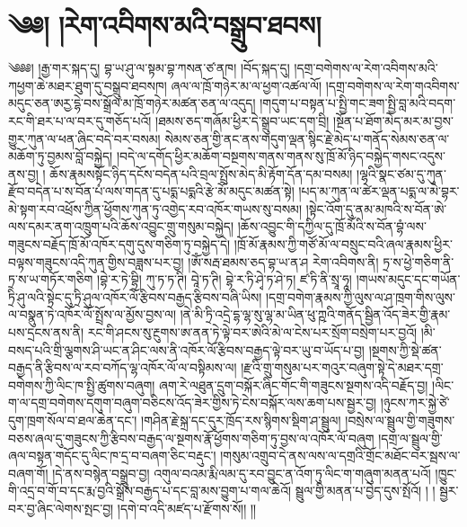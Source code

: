 \chapter{༄༅། །རེག་འབིགས་མའི་བསྒྲུབ་ཐབས།}༄༅༅། །རྒྱ་གར་སྐད་དུ། བྷ་ཡ་ཤུ་ལ་སྟམ་བྷ་ཀསན་ཙ་ནཁ། །བོད་སྐད་དུ། །དགྲ་བགེགས་ལ་རེག་འབིགས་མའི་ཀཕྱག་ཆེ་མཐར་ཐུག་དུ་བསྒྲུབ་ཐབསཁ། ཞལ་ལ་ཁྲོ་གཉེར་མ་ལ་ཕྱག་འཚལ་ལོ། །དགྲ་བགེགས་ལ་རེག་གའབིགས་མདུང་ཅན་ཨརྱ་དྷེ་བས་སྒྲོལ་མ་ཁྲོ་གཉེར་མཚན་ཅན་ལ་འདུད། །གདུག་པ་བསྟན་པ་སྤྱི་གང་ཟག་སྤྱི་བླ་མའི་བདག་རང་གི་ཐར་པ་ལ་བར་དུ་གཅོད་པའོ། །ཐམས་ཅད་གཞོམ་ཕྱིར་དེ་སྒྲུབ་ཡང་དག་བྲི། །སྔོན་པ་ཐོག་མེད་མར་མ་བྱས་གྱུར་ཀུན་ལ་ཕན་ཞིང་བདེ་བར་བསམ། སེམས་ཅན་གྱི་ནང་ནས་གདུག་ལྡན་སྙིང་རྗེ་མེད་པ་གནོད་སེམས་ཅན་ལ་མཆོག་ཏུ་བྱམས་བློ་བསྐྱེད། །བདེ་ལ་དགོད་ཕྱིར་མཆོག་བསྔགས་གནས་གནས་སུ་ཁྲོ་མོ་ཉིད་བསྐྱེད་གསང་འདུས་ནས་བྱ། ། ཆོས་རྣམསསྟོང་ཉིད་དངོས་བདེན་པའི་བྲལ་སྤྲོས་མེད་མི་རྟོག་དོན་དམ་བསམ། །ལྷའི་སྣང་ཙམ་དུ་ཀུན་རྫོབ་བདེན་པ་ས་བོན་པཾ་ལས་གདན་དུ་པདྨ་པདྨའི་རྩེ་མོ་མདུང་མཚན་སྟེ། །པད་མ་ཀུན་ལ་ཚེར་ལྡན་པདྨ་ལ་མེ་བྷར་མེ་སྟག་རབ་འཕྲོས་ཀྱིན་ཕྱོགས་ཀུན་ཏུ་འགྱེད་རབ་འཁོར་གཡས་སུ་བསམ། །སྟེང་འོག་དུ་ནམ་མཁའི་ས་བོན་ཨེ་ལས་དམར་ནག་འཁྲུག་པའི་ཆོས་འབྱུང་གྲུ་གསུམ་བསྐྱེད། །ཆོས་འབྱུང་གི་དཀྱིལ་དུ་ཁྲོ་མོའི་ས་བོན་བྷཾ་ལས་གཟུངས་བརྗོད་ཁྲོ་མོ་འཁོར་དགུ་དུས་གཅིག་ཏུ་བསྐྱེད་དེ། །ཁྲོ་མོ་རྣམས་ཀྱི་གཙོ་མོ་ལ་བསྲུང་བའི་ཞལ་རྣམས་ཕྱིར་བལྟས་གཟུངས་འདི་ཀུན་གྱིས་བཟླས་པར་བྱ། །ཨོཾ་སརྦ་ཐམས་ཅད་བྷ་ཡ་ན་ཤ རེག་འབིགས་ནི། ཏྲ་ས་ཕྱེ་གཅིག་ནི་ཏྲ་ས་ཡ་གཏོར་གཅིག །བྷེ་ར་ཏེ་བྷྲི། ཀུ་ཏ་ཏ་ཊི། བཱེ་ཏ་ཊི། བྷེ་ར་ཏི་ཤྭེ་ཏ་ཤེ་ཏ། ཛ་ཏི་ནི་སྲཱ་ཧཱ། །གཡས་མདུང་དང་གཡོན་ཏྲི་ཤུ་ལའི་སྟེང་དུ་ཏྲི་ཤུལ་འཁོར་ལོ་རྩིབས་བརྒྱད་རྩིབས་བཞི་ཡིས། །དགྲ་བགེག་རྣམས་ཀྱི་ལུས་ལ་ཤ་ཁྲག་གིས་ལུས་ལ་བསྣུན་ཏེ་འཁོར་ལོ་སྤྲོས་ལ་མྱོས་བྱས་ལ། །ནེ་མི་ཏྲི་འདྲེ་དྷ་ལྷ་སུ་ལྷ་མ་ཡིན་ཕུ་ཀྵའི་གནོད་སྦྱིན་འོད་ཟེར་གྱི་རྣམ་པས་དྲངས་ནས་ནི། རང་གི་ཤངས་སུ་རྔུགས་ཨ་ནན་ཏེ་ལྟེ་བར་ཨེའི་མེ་ལ་ངེས་པར་སྲོག་བསྲེག་པར་བྱའོ། །མི་བསད་པའི་གྲི་ལྕགས་ཤི་ཡང་ན་ཤིང་ལས་ནི་འཁོར་ལོ་རྩིབས་བརྒྱད་ལྟེ་བར་ཡུ་བ་ཡོད་པ་བྱ། །སྔགས་ཀྱི་སྡེ་ཚན་བརྒྱད་ནི་རྩིབས་ལ་རབ་བཀོད་ལྷ་འཁོར་ལོ་ལ་བསྟིམས་ལ། །རྫའི་གྲུ་གསུམ་པར་གའུར་བཞུག་སྟེ་དེ་མཐར་དགྲ་བགེགས་ཀྱི་ལིང་ཁ་སྤྱི་ཚུགས་བཞུག། ཞག་རེ་ལཐུན་དྲུག་བསྐོར་ཞིང་གོང་གི་གཟུངས་སྔགས་འདི་བརྗོད་བྱ། །ལིང་ག་ལ་དགྲ་བགེགས་དགུག་བཞུག་བཅིངས་འོད་ཟེར་གྱིས་ཏེ་ངེས་བསྐོར་ལས་ཆག་པས་སྦྱར་བྱ། །ཉུངས་ཀར་སྐྱེ་ཙེ་དུག་ཁྲག་སོལ་བ་ཐལ་ཆེན་དང་། །གཤིན་རྗེ་སྐྲ་དང་དུར་ཁྲོད་རས་སྙིགས་སྡིག་ཤ་སྦྲུལ། །བསྲེས་ལ་སྦྲུལ་གྱི་གཟུགས་བཅས་ཞལ་དུ་གཟུངས་ཀྱི་རྩིབས་བརྒྱད་ལ་སྔགས་རྣོ་ཕྱོགས་གཅིག་ཏུ་བྱས་ལ་འཁོར་ལོ་བཞུག །དགྲ་ལ་སྦྲུལ་གྱི་ཞལ་བསྟན་གདོང་དུ་ལིང་ཁ་དྲ་བ་བཞག་ཅིང་བརྡུང་། །གསུམ་འགྲུབ་དེ་ནས་ལས་ལ་དགྲའི་གྲོང་མཐོང་བར་སྦས་ལ་བཞག་གོ། །དེ་ནས་བསྙེན་བསྒྲུབ་བྱ། འགུལ་བའམ་རྨི་ལམ་དུ་རབ་བྱུང་ན་འོག་ཏུ་ལིང་ག་གཞུག་མནན་པའོ། །ཁྱུང་གི་འདྲ་བ་གོ་བ་དང་རྨ་བྱའི་སྒྲོས་བརྒྱད་པ་དང་བླ་མས་བྱུག་པ་གལ་ཆེའོ། སྦྲུལ་གྱི་མནན་པ་བྱེད་དུས་སྤོའོ། ། ། སྦྱར་བར་བྱ་ཞིང་ལེགས་སྤང་བྱ། །དགེ་བ་འདི་མཛད་པ་རྫོགས་སོ།། །།